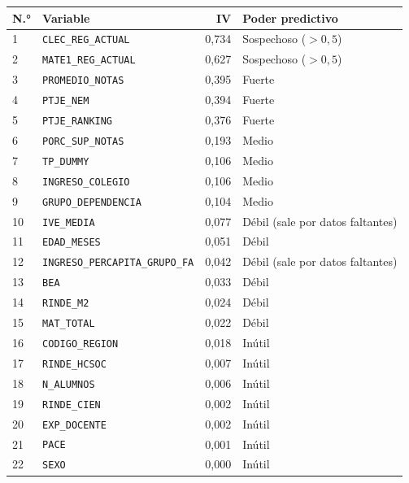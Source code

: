 \documentclass[11pt]{article}
\begin{document}
\begin{center}
\begin{tabular}{llrl}
\toprule
\textbf{N.°} & \textbf{Variable} & \textbf{IV} & \textbf{Poder predictivo} \\
\midrule
1  & \texttt{CLEC\_REG\_ACTUAL}             & 0,734 & Sospechoso ($>0{,}5$) \\
2  & \texttt{MATE1\_REG\_ACTUAL}            & 0,627 & Sospechoso ($>0{,}5$) \\
3  & \texttt{PROMEDIO\_NOTAS}               & 0,395 & Fuerte \\
4  & \texttt{PTJE\_NEM}                     & 0,394 & Fuerte \\
5  & \texttt{PTJE\_RANKING}                 & 0,376 & Fuerte \\
6  & \texttt{PORC\_SUP\_NOTAS}              & 0,193 & Medio \\
7  & \texttt{TP\_DUMMY}                     & 0,106 & Medio \\
8  & \texttt{INGRESO\_COLEGIO}              & 0,106 & Medio \\
9  & \texttt{GRUPO\_DEPENDENCIA}            & 0,104 & Medio \\
10 & \texttt{IVE\_MEDIA}                    & 0,077 & Débil (sale por datos faltantes) \\
11 & \texttt{EDAD\_MESES}                   & 0,051 & Débil \\
12 & \texttt{INGRESO\_PERCAPITA\_GRUPO\_FA} & 0,042 & Débil (sale por datos faltantes) \\
13 & \texttt{BEA}                           & 0,033 & Débil \\
14 & \texttt{RINDE\_M2}                     & 0,024 & Débil \\
15 & \texttt{MAT\_TOTAL}                    & 0,022 & Débil \\
\midrule
\rowcolor{gray!15}
16 & \texttt{CODIGO\_REGION}                & 0,018 & Inútil \\
\rowcolor{gray!15}
17 & \texttt{RINDE\_HCSOC}                  & 0,007 & Inútil \\
\rowcolor{gray!15}
18 & \texttt{N\_ALUMNOS}                    & 0,006 & Inútil \\
\rowcolor{gray!15}
19 & \texttt{RINDE\_CIEN}                   & 0,002 & Inútil \\
\rowcolor{gray!15}
20 & \texttt{EXP\_DOCENTE}                  & 0,002 & Inútil \\
\rowcolor{gray!15}
21 & \texttt{PACE}                          & 0,001 & Inútil \\
\rowcolor{gray!15}
22 & \texttt{SEXO}                          & 0,000 & Inútil \\
\bottomrule
\end{tabular}
\end{center}
\end{document}
